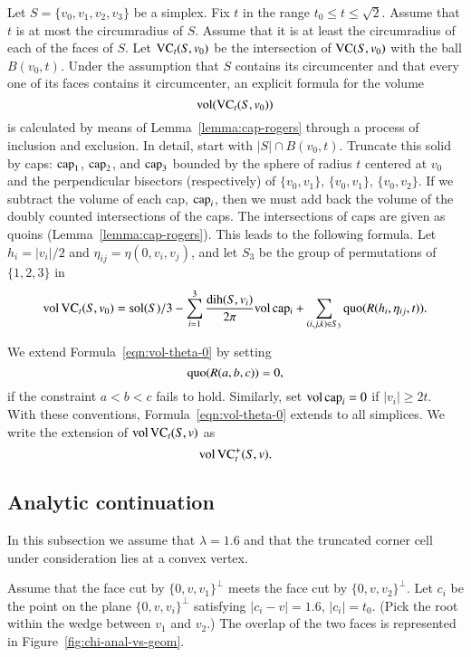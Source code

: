  Let $S=\{v_0,v_1,v_2,v_3\}$ be a simplex. Fix $t$ in the range
$t_0\le t\le\sqrt2$.  Assume that $t$ is at most the circumradius
of $S$. Assume that it is at least the circumradius of each of the
faces of $S$.  Let ${\operatorname{VC}}_t(S,v_0)$ be the intersection of
${\operatorname{VC}}(S,v_0)$ with the ball $B(v_0,t)$. Under the assumption
that $S$ contains its circumcenter and that every one of its faces
contains it circumcenter, an explicit formula for the volume
$${\operatorname{vol}}({\operatorname{VC}}_t(S,v_0))$$ is calculated by means of
Lemma~\ref{lemma:cap-rogers} through a process of inclusion and
exclusion. In detail, start with $|S|\cap B(v_0,t)$. Truncate this
solid by caps: ${\operatorname{cap}}_1$, ${\operatorname{cap}}_2$, and
${\operatorname{cap}}_3$ bounded by the sphere of radius $t$ centered at $v_0$
and the perpendicular bisectors (respectively) of $\{v_0,v_1\}$,
$\{v_0,v_1\}$, $\{v_0,v_2\}$.  If we subtract the volume of each
cap, ${\operatorname{cap}}_i$, then we must add back the volume of the doubly
counted intersections of the caps.  The intersections of caps are
given as quoins (Lemma~\ref{lemma:cap-rogers}).  This leads to the
following formula. Let $h_i = |v_i|/2$ and
$\eta_{ij}=\eta(0,v_i,v_j)$, and let $S_3$ be the group of
permutations of $\{1,2,3\}$ in
\begin{equation}
   {\operatorname{vol}}\,{\operatorname{VC}}_t(S,v_0) =
   \operatorname{sol}(S)/3 - \sum_{i=1}^3 \frac{\operatorname{dih}(S,v_i)}{2\pi}{\operatorname{vol}}\,{\operatorname{cap_i}}
   +\sum_{(i,j,k)\in S_3} \operatorname{quo}(R(h_i,\eta_{ij},t)).
   \label{eqn:vol-theta-0}
\end{equation}


We extend Formula~\ref{eqn:vol-theta-0} by setting
    $$\operatorname{quo}(R(a,b,c)) = 0,$$
if the constraint $a < b < c$ fails to hold.  Similarly, set
${\operatorname{vol}}\,{\operatorname{cap}}_i=0$ if $|v_i|\ge 2t$.  With these
conventions,  Formula~\ref{eqn:vol-theta-0} extends to all
simplices.  We write the extension of ${\operatorname{vol}}\,{\operatorname{VC}}_t(S,v)$
as
$${\operatorname{vol}}\,{{\operatorname{VC}}^+_t}(S,v).$$


\subsection{Analytic continuation} %

In this subsection we assume that $\lambda=1.6$ and that the
truncated corner cell under consideration lies at a convex vertex.

Assume that the face cut by $\{0,v,v_1\}^\perp$ meets the face cut by
$\{0,v,v_2\}^\perp$.  Let $c_i$ be the point on the plane
$\{0,v,v_i\}^\perp$ satisfying $|c_i-v|=1.6$, $|c_i|=t_0$. (Pick the root
within the wedge between $v_1$ and $v_2$.) The overlap of the two faces
is represented in Figure~\ref{fig:chi-anal-vs-geom}.

